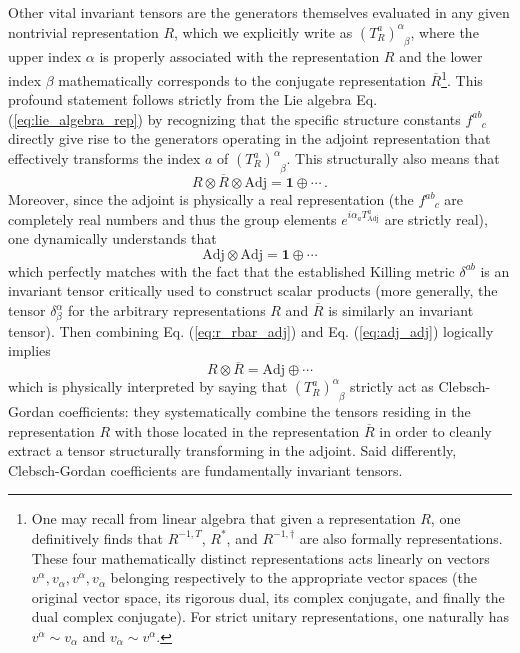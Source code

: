 Other vital invariant tensors are the generators themselves evaluated in any given nontrivial representation \(R\), which we explicitly write as \((T_R^a)^\alpha_{\phantom{\alpha}\beta}\), where the upper index \(\alpha\) is properly associated with the representation \(R\) and the lower index \(\beta\) mathematically corresponds to the conjugate representation \(\overline{R}\)\footnote{One may recall from linear algebra that given a representation \(R\), one definitively finds that \(R^{-1,T}\), \(R^*\), and \(R^{-1,\dagger}\) are also formally representations. These four mathematically distinct representations acts linearly on vectors \(v^\alpha, v_\alpha, v^{\dot{\alpha}}, v_{\dot{\alpha}}\) belonging respectively to the appropriate vector spaces (the original vector space, its rigorous dual, its complex conjugate, and finally the dual complex conjugate). For strict unitary representations, one naturally has \(v^{\dot{\alpha}} \sim v_\alpha\) and \(v_{\dot{\alpha}} \sim v^\alpha\).}. This profound statement follows strictly from the Lie algebra Eq. (\ref{eq:lie_algebra_rep}) by recognizing that the specific structure constants \(f^{ab}_{\phantom{ab}c}\) directly give rise to the generators operating in the adjoint representation that effectively transforms the index \(a\) of \((T_R^a)^\alpha_{\phantom{\alpha}\beta}\). This structurally also means that
\begin{equation} \label{eq:r_rbar_adj}
    R \otimes \overline{R} \otimes \mathrm{Adj} = \mathbf{1} \oplus \cdots \, .
\end{equation}
Moreover, since the adjoint is physically a real representation (the \(f^{ab}_{\phantom{ab}c}\) are completely real numbers and thus the group elements \(e^{i\alpha_a T_{\mathrm{Adj}}^a}\) are strictly real), one dynamically understands that
\begin{equation} \label{eq:adj_adj}
    \mathrm{Adj} \otimes \mathrm{Adj} = \mathbf{1} \oplus \cdots
\end{equation}
which perfectly matches with the fact that the established Killing metric \(\delta^{ab}\) is an invariant tensor critically used to construct scalar products (more generally, the tensor \(\delta^\alpha_\beta\) for the arbitrary representations \(R\) and \(\overline{R}\) is similarly an invariant tensor). Then combining Eq. (\ref{eq:r_rbar_adj}) and Eq. (\ref{eq:adj_adj}) logically implies
\begin{equation} \label{eq:r_rbar_clebsch}
    R \otimes \overline{R} = \mathrm{Adj} \oplus \cdots
\end{equation}
which is physically interpreted by saying that \((T_R^a)^\alpha_{\phantom{\alpha}\beta}\) strictly act as Clebsch-Gordan coefficients: they systematically combine the tensors residing in the representation \(R\) with those located in the representation \(\overline{R}\) in order to cleanly extract a tensor structurally transforming in the adjoint. Said differently, Clebsch-Gordan coefficients are fundamentally invariant tensors.

